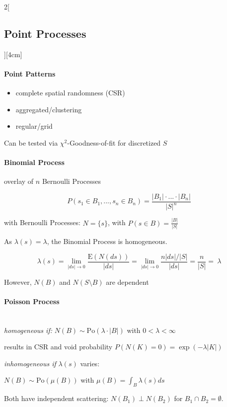 \documentclass[8pt]{extarticle}
\begin{document}
\begin{multicols}{2}[\subsection{Point Processes}][4cm]
\paragraph{Point Patterns}
\vspace{-0.8em}
\begin{itemize}[itemsep=-0.5em]
\item complete spatial randomness (CSR)
\item aggregated/clustering
\item regular/grid
\end{itemize}
Can be tested via $\chi^2$-Goodness-of-fit for discretized $S$

\paragraph{Binomial Process} overlay of $n$ Bernoulli Processes

$$P(s_1\in B_1,...,s_n \in B_n)=\frac{|B_1|\cdot...\cdot |B_n|}{|S|^n}$$

\noindent with Bernoulli Processes: $N=\{s\}$, with $P(s\in B)=\frac{|B|}{|S|}$

\noindent As $\lambda(s)=\lambda$, the Binomial Process is homogeneous.

\begin{Proof}
\vspace{-1em}
$$\lambda(s)=\lim_{|ds|\rightarrow 0} \frac{\mathrm{E}(N(ds))}{|ds|} = \lim_{|ds|\rightarrow 0} \frac{n|ds|/|S|}{|ds|} = \frac{n}{|S|}=\:\lambda$$
\end{Proof}

\noindent However, $N(B)$ and $N(S\setminus B)$ are dependent


\paragraph{Poisson Process} \ \\

\noindent \textit{homogeneous if:} $N(B) \sim \mathrm{Po}(\lambda\cdot |B|)$  with $0<\lambda<\infty$

\noindent results in CSR and void probability $P(N(K)=0)=\exp(-\lambda|K|)$



\noindent \textit{inhomogeneous if} $\lambda(s)$ varies:

$N(B) \sim \mathrm{Po}(\mu(B))$  with $\mu(B)=\int_B\lambda(s)ds$ 


\noindent Both have independent scattering: $N(B_1) {\perp} N(B_2)$ for $B_1 {\cap} B_2 {=} \emptyset$.


\end{multicols}
\end{document}
